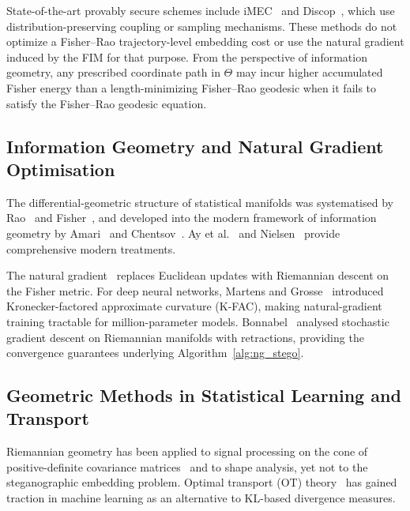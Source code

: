 \documentclass[a4paper,fleqn]{cas-dc}
\begin{document}
State-of-the-art provably secure schemes include iMEC~\cite{imec2022}
and Discop~\cite{discop2023}, which use distribution-preserving coupling or
sampling mechanisms.
These methods do not optimize a Fisher--Rao trajectory-level embedding cost or
use the natural gradient induced by the FIM for that purpose.
From the perspective of information geometry, any prescribed coordinate path in
$\Theta$ may incur higher accumulated Fisher energy than a length-minimizing
Fisher--Rao geodesic when it fails to satisfy the Fisher--Rao geodesic equation.

\subsection{Information Geometry and Natural Gradient Optimisation}

The differential-geometric structure of statistical manifolds was
systematised by Rao~\cite{rao1945information} and
Fisher~\cite{fisher1925theory}, and developed into the modern framework
of information geometry by Amari~\cite{amari1985differential,amari2000methods,amari1998natural}
and Chentsov~\cite{chentsov1982statistical}.
Ay et al.~\cite{ay2017information} and Nielsen~\cite{nielsen2020elementary}
provide comprehensive modern treatments.

The natural gradient~\cite{amari1998natural} replaces Euclidean updates
with Riemannian descent on the Fisher metric.
For deep neural networks, Martens and Grosse~\cite{martens2015optimizing}
introduced Kronecker-factored approximate curvature (K-FAC), making
natural-gradient training tractable for million-parameter models.
Bonnabel~\cite{bonnabel2013stochastic} analysed stochastic gradient descent
on Riemannian manifolds with retractions, providing the convergence
guarantees underlying Algorithm~\ref{alg:ng_stego}.

\subsection{Geometric Methods in Statistical Learning and Transport}

Riemannian geometry has been applied to signal processing on the cone of
positive-definite covariance matrices~\cite{do2002riemannian} and to
shape analysis, yet not to the steganographic embedding problem.
Optimal transport (OT) theory~\cite{villani2009optimal,peyre2019computational}
has gained traction in machine learning as an alternative to KL-based
divergence measures.
\end{document}
